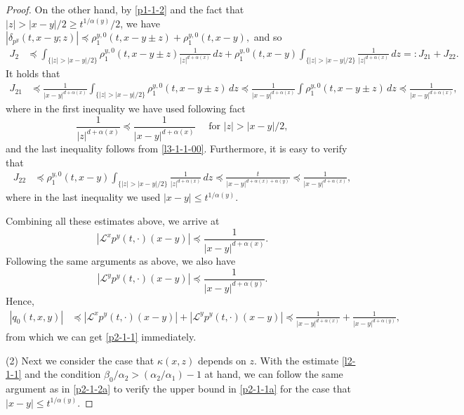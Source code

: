\documentclass[a4paper,11pt]{amsart}
\renewcommand{\le}{\leqslant}
\renewcommand{\ge}{\geqslant}
\newcommand{\B}{\beta}
\newcommand{\p}{\preceq}
\newcommand{\K}{\kappa}
\newcommand{\A}{\alpha}
\def\LL{{\mathcal L}}
\theoremstyle{definition}
\begin{document}
\begin{proof}
On the other hand,
by \eqref{p1-1-2} and the fact that $|z|>{|x-y|}/{2}\ge t^{{1}/{\A(y)}}/2$, we have
$ \left|\delta_{p^y}(t,x-y;z)\right|\p \rho^{y,0}_1(t,x-y\pm z)+\rho^{y,0}_1(t,x-y),$ and so \begin{align*}
J_2&\p  \int_{\{|z|>{|x-y|}/{2}\}}\!\!
\rho^{y,0}_1(t,x-y\pm z)\frac{1}{|z|^{d+\A(x)}}\,dz +
\rho^{y,0}_1(t,x-y)\int_{\{|z|>{|x-y|}/{2}\}}\!\!
\frac{1}{|z|^{d+\A(x)}}\,dz=:J_{21}+J_{22}.
\end{align*}
It holds that
\begin{align*}
J_{21}&\p \frac{1}{|x-y|^{d+\A(x)}} \int_{\{|z|>{|x-y|}/{2}\}}\rho^{y,0}_1(t,x-y\pm z)\,dz\p \frac{1}{|x-y|^{d+\A(x)}}\int \rho^{y,0}_1(t,x-y\pm z)\,dz\p \frac{1}{|x-y|^{d+\A(x)}},
\end{align*}
where in the first inequality we have used following fact
$$ \frac{1}{|z|^{d+\A(x)}}\p \frac{1}{|x-y|^{d+\A(x)}}\quad\textrm{ for } |z|>{|x-y|}/{2},$$
and the last inequality follows from \eqref{l3-1-1-00}.
Furthermore, it is easy to verify that
\begin{align*}
J_{22}&\p \rho^{y,0}_1(t,x-y)
\int_{\{|z|>{|x-y|}/{2}\}}\frac{1}{|z|^{d+\A(x)}}\, dz\p \frac{t}{|x-y|^{d+\A(x)+\A(y)}}\p \frac{1}{|x-y|^{d+\A(x)}},
\end{align*} where in the last inequality we used $|x-y|\le t^{{1}/{\A(y)}}$.

Combining all these estimates above, we arrive at
$$ \left| \LL^xp^y(t,\cdot)(x-y)\right|\p \frac{1}{|x-y|^{d+\A(x)}}.$$
Following the same arguments as above, we also have
$$ \left| \LL^yp^y(t,\cdot)(x-y)\right|\p \frac{1}{|x-y|^{d+\A(y)}}.$$
Hence,
\begin{align*}
|q_0(t,x,y)|&\p
\left| \LL^x p^y(t,\cdot)(x-y)\right|+\left| \LL^yp^y(t,\cdot)(x-y)\right|\p \frac{1}{|x-y|^{d+\A(x)}}+\frac{1}{|x-y|^{d+\A(y)}},
\end{align*}
from which we can get \eqref{p2-1-1} immediately.

(2) Next we consider the case that $\K(x,z)$ depends on $z$.
With the estimate \eqref{l2-1-1} and the condition
${\B_0}/{\A_2}>({\A_2}/{\A_1})-1$ at hand, we can follow the same argument as in \eqref{p2-1-2a} to verify the
upper bound in \eqref{p2-1-1a} for the case that $|x-y|\le t^{{1}/{\A(y)}}$.


\end{proof}
\end{document}
